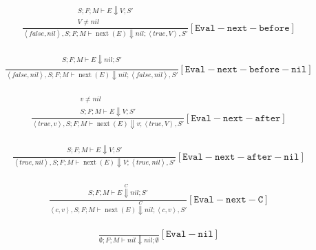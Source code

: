 \documentclass{scrartcl}
\DeclareMathOperator{\nextop}{next}
\begin{document}
    
    \begin{align*}
    \frac{
        \begin{matrix}
        S; F; M \vdash E \Downarrow V; S' \\
        V \neq nil
        \end{matrix}
    }{
        \left<false, nil \right>, S; F; M \vdash \nextop(E) \Downarrow nil; \left< true, V \right>, S'
    }[\mathtt{Eval-next-before}]
    \end{align*}
    
    \begin{align*}
    \frac{
        \begin{matrix}
        S; F; M \vdash E \Downarrow nil; S' \\
        \end{matrix}
    }{
        \left<false, nil \right>, S; F; M \vdash \nextop(E) \Downarrow nil; \left< false, nil \right>, S'
    }[\mathtt{Eval-next-before-nil}]
    \end{align*}
    
    \begin{align*}
    \frac{
        \begin{matrix}
        v \neq nil \\
        S; F; M \vdash E \Downarrow V; S'
        \end{matrix}
    }{
        \left<true, v \right>, S; F; M \vdash \nextop(E) \Downarrow v; \left< true, V \right>, S'
    }[\mathtt{Eval-next-after}]
    \end{align*}
    
    \begin{align*}
    \frac{
        \begin{matrix}
        S; F; M \vdash E \Downarrow V; S'
        \end{matrix}
    }{
        \left<true, nil \right>, S; F; M \vdash \nextop(E) \Downarrow V; \left< true, nil \right>, S'
    }[\mathtt{Eval-next-after-nil}]
    \end{align*}
    
    \begin{align*}
    \frac{
        \begin{matrix}
        S; F; M \vdash E \overset{C}{\Downarrow} nil; S'
        \end{matrix}
    }{
        \left<c, v\right>, S; F; M \vdash \nextop(E) \overset{C}{\Downarrow} nil; \left<c, v\right>, S'
    }[\mathtt{Eval-next-C}]
    \end{align*}
    
    \begin{align*}
    \frac{}{
        \emptyset; F; M \vdash nil \Downarrow nil; \emptyset
    }[\mathtt{Eval-nil}]
    \end{align*}
    
\end{document}
